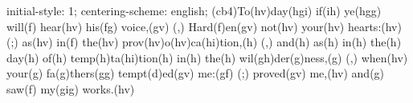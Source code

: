 initial-style: 1;
centering-scheme: english;
(cb4)To(hv)day(hgi) if(ih) ye(hgg) will(f) hear(hv) his(fg) voice,(gv) (,) Hard(f)en(gv) not(hv) your(hv) hearts:(hv) (;) as(hv) in(f) the(hv) prov(hv)o(hv)ca(hi)tion,(h) (,) and(h) as(h) in(h) the(h) day(h) of(h) temp(h)ta(hi)tion(h) in(h) the(h) wil(gh)der(g)ness,(g) (,) when(hv) your(g) fa(g)thers(gg) tempt(d)ed(gv) me:(gf) (;) proved(gv) me,(hv) and(g) saw(f) my(gig) works.(hv)
